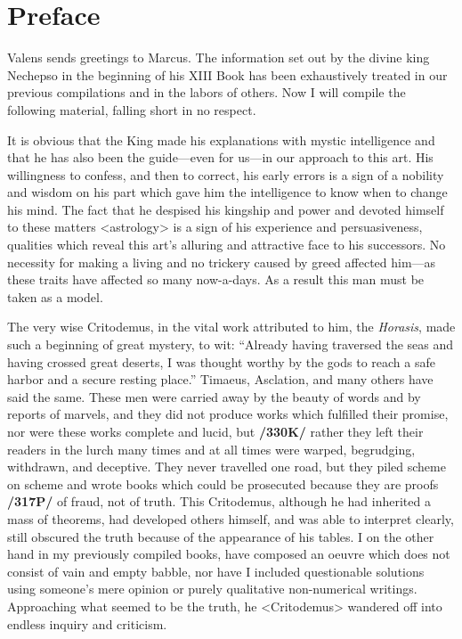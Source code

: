 \section{Preface}

Valens sends greetings to Marcus. The information set out by the divine king Nechepso in the beginning of his XIII Book has been exhaustively treated in our previous compilations and in the labors of others. Now I will compile the following material, falling short in no respect. 

It is obvious that the King made his explanations with mystic intelligence and that he has also been the guide—even for us—in our
approach to this art. His willingness to confess, and then to correct, his early errors is a sign of a nobility and wisdom on his part which gave him the intelligence to know when to change his mind. The fact that
he despised his kingship and power and devoted himself to these matters <astrology> is a sign of his experience and persuasiveness, qualities which reveal this art’s alluring and attractive face to his successors. No necessity for making a living and no trickery caused by greed affected him—as these traits have affected so many now-a-days. As a result this man must be taken as a model.

The very wise Critodemus, in the vital work attributed to him, the \textit{Horasis}, made such a beginning of great mystery, to wit: “Already having traversed the seas and having crossed great deserts, I was thought worthy by the gods to reach a safe harbor and a secure resting place.” Timaeus, Asclation, and many others have said the same. These men were carried away by the beauty of words and by reports of marvels, and they did not produce works which fulfilled their promise, nor were these works complete and lucid, but \textbf{/330K/} rather they left their readers in the lurch many times and at all times were warped, begrudging, withdrawn, and deceptive. They never travelled one road, but they piled scheme on scheme and wrote
books which could be prosecuted because they are proofs \textbf{/317P/} of fraud, not of truth. This Critodemus, although he had inherited a mass of theorems, had developed others himself, and was able to interpret clearly, still obscured the truth because of the appearance of his tables. I on the other hand in my previously compiled books, have composed an oeuvre which does not consist of vain and empty babble, nor have I included questionable solutions using someone’s mere opinion or purely qualitative non-numerical writings. 
Approaching what seemed to be the truth, he <Critodemus> wandered off into endless inquiry and criticism. 

